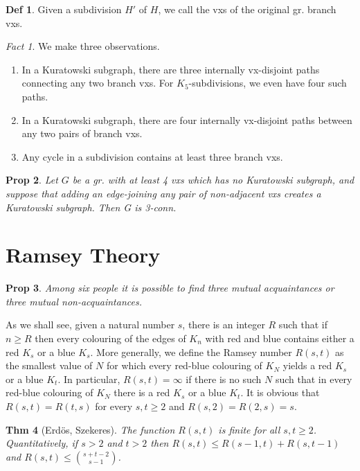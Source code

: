 \documentclass[11pt, fleqn, a4paper, landscape]{article}
\theoremstyle{plain} %
\newtheorem{thm}{Thm}
\newtheorem{pro}[thm]{Prop}
\theoremstyle{remark} %
\newtheorem{fact}{Fact}
\theoremstyle{definition} %
\newtheorem{defi}[thm]{Def}
\begin{document}
\begin{multicols}{5}
\begin{defi}
Given a subdivision $H'$ of $H$, we call the vxs of the original gr. branch vxs.
\end{defi}
\addtocounter{thm}{1}
\begin{fact}
We make three observations. 
\begin{enumerate}
\item  In a Kuratowski subgraph, there are three internally vx-disjoint paths connecting any two
branch vxs. For $K_5$-subdivisions, we even have four such paths.
\item In a Kuratowski subgraph, there are four internally vx-disjoint paths between any two pairs
of branch vxs.
\item Any cycle in a subdivision contains at least three branch vxs.
\end{enumerate}
\end{fact}

\begin{pro}
Let $G$ be a gr. with at least 4 vxs which has no Kuratowski subgraph, and suppose that adding an edge-joining any pair of non-adjacent vxs creates a Kuratowski subgraph.
Then G is 3-conn.
\end{pro}

\section{Ramsey Theory}

\begin{pro}
Among six people it is possible to find three mutual acquaintances or three mutual non-acquaintances.
\end{pro}

As we shall see, given a natural number $s$, there is an integer $R$ such that if $n \ge R$ then every colouring of the edges of $K_n$ with red and blue contains either a red $K_s$ or a blue $K_s$. More generally, we define the Ramsey number $R(s, t)$ as the smallest value of $N$ for which every red-blue colouring of $K_N$ yields a red $K_s$ or a blue $K_t$. In particular, $R(s, t) = \infty$ if there is no such $N$ such that in every red-blue
colouring of $K_N$ there is a red $K_s$ or a blue $K_t$. It is obvious that
$ R(s, t) = R(t, s)$ for every $s, t \ge 2$ and $R(s, 2) = R(2, s) = s$. 

\begin{thm}[Erdös, Szekeres]
The function $R(s, t)$ is finite for all $s, t \ge 2$. Quantitatively, if $s > 2 $ and $t > 2$ then $R(s, t)\le R(s - 1, t) + R(s, t - 1)$ and $R(s, t) \le \binom{s+t-2}{s-1}$.
\end{thm}


\end{multicols}
\end{document}
